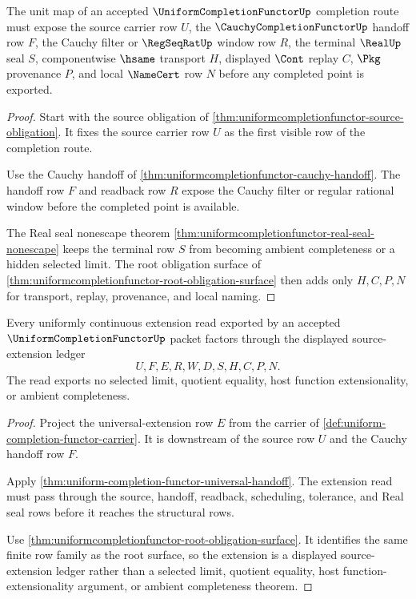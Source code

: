 \begin{theorem}
\label{thm:uniformcompletionfunctor-unit-root-obligation}
The unit map of an accepted $\UniformCompletionFunctorUp$ completion route must expose the source carrier row $U$, the $\CauchyCompletionFunctorUp$ handoff row $F$, the Cauchy filter or $\RegSeqRatUp$ window row $R$, the terminal $\RealUp$ seal $S$, componentwise $\hsame$ transport $H$, displayed $\Cont$ replay $C$, $\Pkg$ provenance $P$, and local $\NameCert$ row $N$ before any completed point is exported.
\end{theorem}
\begin{proof}
Start with the source obligation of \autoref{thm:uniformcompletionfunctor-source-obligation}. It fixes the source carrier row $U$ as the first visible row of the completion route.

Use the Cauchy handoff of \autoref{thm:uniformcompletionfunctor-cauchy-handoff}. The handoff row $F$ and readback row $R$ expose the Cauchy filter or regular rational window before the completed point is available.

The Real seal nonescape theorem \autoref{thm:uniformcompletionfunctor-real-seal-nonescape} keeps the terminal row $S$ from becoming ambient completeness or a hidden selected limit. The root obligation surface of \autoref{thm:uniformcompletionfunctor-root-obligation-surface} then adds only $H,C,P,N$ for transport, replay, provenance, and local naming.
\end{proof}

\begin{theorem}
\label{thm:uniformcompletionfunctor-extension-root-obligation}
Every uniformly continuous extension read exported by an accepted $\UniformCompletionFunctorUp$ packet factors through the displayed source-extension ledger
$$
U,F,E,R,W,D,S,H,C,P,N .
$$
The read exports no selected limit, quotient equality, host function extensionality, or ambient completeness.
\end{theorem}
\begin{proof}
Project the universal-extension row $E$ from the carrier of \autoref{def:uniform-completion-functor-carrier}. It is downstream of the source row $U$ and the Cauchy handoff row $F$.

Apply \autoref{thm:uniform-completion-functor-universal-handoff}. The extension read must pass through the source, handoff, readback, scheduling, tolerance, and Real seal rows before it reaches the structural rows.

Use \autoref{thm:uniformcompletionfunctor-root-obligation-surface}. It identifies the same finite row family as the root surface, so the extension is a displayed source-extension ledger rather than a selected limit, quotient equality, host function-extensionality argument, or ambient completeness theorem.
\end{proof}

